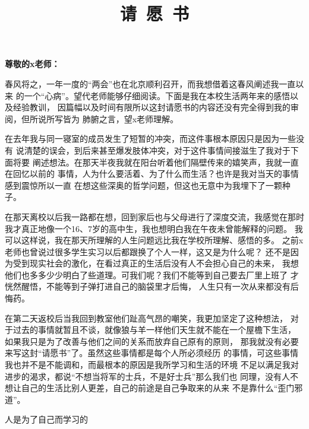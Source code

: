 \documentclass[a4paper]{article}
\title{\zihao{-0} \textbf{请~愿~书}}
\author{} \date{}
\begin{document}
\maketitle

\begin{flushleft}
	\textbf{尊敬的x老师：}
\end{flushleft}

春风将之，一年一度的“两会”也在北京顺利召开，而我想借着这春风阐述我一直以来
的一个“心病”。望代老师能够仔细阅读。下面是我在本校生活两年来的感悟以及经验教训，
因篇幅以及时间有限所以这封请愿书的内容还没有完全得到我的审阅，但所说所写皆为
肺腑之言，望x老师理解。

在去年我与同一寝室的成员发生了短暂的冲突，而这件事根本原因只是因为一些没有
说清楚的误会，到后来甚至爆发肢体冲突，对于这件事情间接滋生了我对于下面将要
阐述想法。在那天半夜我就在阳台听着他们隔壁传来的嬉笑声，我就一直在回忆以前的
事情，人为什么要活着、为了什么而生活？也许是我对当天的事情感到震惊所以一直
在想这些深奥的哲学问题，但这也无意中为我埋下了一颗种子。

在那天离校以后我一路都在想，回到家后也与父母进行了深度交流，我感觉在那时
我才真正地像一个16、7岁的高中生，我也想明白我在午夜未曾能解释的问题。
我可以这样说，我在那天所理解的人生问题远比我在学校所理解、感悟的多。
之前x老师也曾说过很多学生实习以后都跟换了个人一样，这又是为什么呢？
还不是因为受到现实社会的激化，在看过真正的生活后没有人不会担心自己的未来，
我想他们也多多少少明白了些道理。可我们呢？我们不能等到自己要去厂里上班了
才恍然醒悟，不能等到子弹打进自己的脑袋里才后悔，
人生只有一次从来都没有后悔药。

在第二天返校后当我回到教室他们趾高气昂的嘲笑，我更加坚定了这种想法，
对于过去的事情就暂且不谈，就像狼与羊一样他们天生就不能在一个屋檐下生活，
如果我只是为了改善与他们之间的关系而放弃自己原有的原则，
那我就没有必要来写这封“请愿书”了。虽然这些事情都是每个人所必须经历
的事情，可这些事情我也并不是不能调和，而最根本的原因是我所学习和生活的环境
不足以满足我对进步的渴求，都说“不想当将军的士兵，不是好士兵”那么我们也
同理，没有人不想让自己的生活比别人更差，自己的前途是自己争取来的从来
不是靠什么“歪门邪道”。

人是为了自己而学习的
\end{document}
